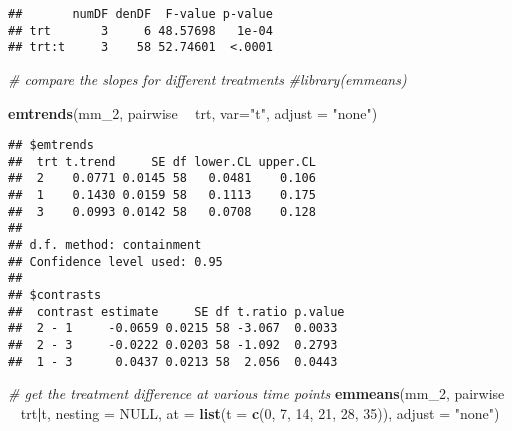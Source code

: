 \documentclass[]{book}
\newenvironment{Shaded}{\begin{snugshade}}{\end{snugshade}}
\newcommand{\CommentTok}[1]{\textcolor[rgb]{0.56,0.35,0.01}{\textit{#1}}}
\newcommand{\DataTypeTok}[1]{\textcolor[rgb]{0.13,0.29,0.53}{#1}}
\newcommand{\DecValTok}[1]{\textcolor[rgb]{0.00,0.00,0.81}{#1}}
\newcommand{\KeywordTok}[1]{\textcolor[rgb]{0.13,0.29,0.53}{\textbf{#1}}}
\newcommand{\NormalTok}[1]{#1}
\newcommand{\OperatorTok}[1]{\textcolor[rgb]{0.81,0.36,0.00}{\textbf{#1}}}
\newcommand{\OtherTok}[1]{\textcolor[rgb]{0.56,0.35,0.01}{#1}}
\newcommand{\StringTok}[1]{\textcolor[rgb]{0.31,0.60,0.02}{#1}}
\begin{document}
\begin{verbatim}
##       numDF denDF  F-value p-value
## trt       3     6 48.57698   1e-04
## trt:t     3    58 52.74601  <.0001
\end{verbatim}

\begin{Shaded}
\begin{Highlighting}[]
\CommentTok{# compare the slopes for different treatments}
\CommentTok{#library(emmeans)}

\KeywordTok{emtrends}\NormalTok{(mm_}\DecValTok{2}\NormalTok{, pairwise }\OperatorTok{~}\StringTok{ }\NormalTok{trt, }\DataTypeTok{var=}\StringTok{"t"}\NormalTok{, }\DataTypeTok{adjust =} \StringTok{"none"}\NormalTok{)}
\end{Highlighting}
\end{Shaded}

\begin{verbatim}
## $emtrends
##  trt t.trend     SE df lower.CL upper.CL
##  2    0.0771 0.0145 58   0.0481    0.106
##  1    0.1430 0.0159 58   0.1113    0.175
##  3    0.0993 0.0142 58   0.0708    0.128
## 
## d.f. method: containment 
## Confidence level used: 0.95 
## 
## $contrasts
##  contrast estimate     SE df t.ratio p.value
##  2 - 1     -0.0659 0.0215 58 -3.067  0.0033 
##  2 - 3     -0.0222 0.0203 58 -1.092  0.2793 
##  1 - 3      0.0437 0.0213 58  2.056  0.0443
\end{verbatim}

\begin{Shaded}
\begin{Highlighting}[]
\CommentTok{# get the treatment difference at various time points}
\KeywordTok{emmeans}\NormalTok{(mm_}\DecValTok{2}\NormalTok{, pairwise }\OperatorTok{~}\StringTok{ }\NormalTok{trt}\OperatorTok{|}\NormalTok{t, }\DataTypeTok{nesting =} \OtherTok{NULL}\NormalTok{, }\DataTypeTok{at =} \KeywordTok{list}\NormalTok{(}\DataTypeTok{t =} \KeywordTok{c}\NormalTok{(}\DecValTok{0}\NormalTok{, }\DecValTok{7}\NormalTok{, }\DecValTok{14}\NormalTok{, }\DecValTok{21}\NormalTok{, }\DecValTok{28}\NormalTok{, }\DecValTok{35}\NormalTok{)), }\DataTypeTok{adjust =} \StringTok{"none"}\NormalTok{)}
\end{Highlighting}
\end{Shaded}
\end{document}
